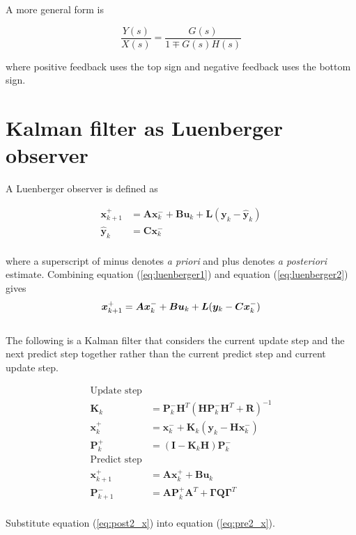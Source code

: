 \documentclass[10pt,conference,compsoc]{IEEEtran}
\newcommand{\mtx}[1] {\bm #1}
\begin{document}
A more general form is

\begin{equation}
  \frac{Y(s)}{X(s)} = \frac{G(s)}{1 \mp G(s) H(s)}
\end{equation}

where positive feedback uses the top sign and negative feedback uses the bottom
sign.

\section{Kalman filter as Luenberger observer} \label{sec:app_kalman_luenberger}

A Luenberger observer is defined as

\begin{align}
  \mtx{x}_{k+1}^+ &= \mtx{A} \mtx{x}_k^- + \mtx{B} \mtx{u}_k + \mtx{L}
    (\mtx{y}_k - \hat{\mtx{y}}_k) \label{eq:luenberger1} \\
  \hat{\mtx{y}}_k &= \mtx{C} \mtx{x}_k^- \label{eq:luenberger2} \\ \nonumber
\end{align}

where a superscript of minus denotes \textit{a priori} and plus denotes
\textit{a posteriori} estimate. Combining equation (\ref{eq:luenberger1}) and
equation (\ref{eq:luenberger2}) gives \\
\begin{equation} \label{eq:luenberger}
  \mtx{x}_{k+1}^+ = \mtx{A} \mtx{x}_k^- + \mtx{B} \mtx{u}_k + \mtx{L}
    (\mtx{y}_k - \mtx{C} \mtx{x}_k^-) \\
\end{equation}
\\
The following is a Kalman filter that considers the current update step and the
next predict step together rather than the current predict step and current
update step.

\begin{align}
  \text{Update step} \nonumber \\
  \mtx{K}_k &= \mtx{P}_k^- \mtx{H}^T (\mtx{H}\mtx{P}_k^- \mtx{H}^T +
    \mtx{R})^{-1} \\
  \mtx{x}_k^+ &= \mtx{x}_k^- + \mtx{K}_k (\mtx{y}_k - \mtx{H} \mtx{x}_k^-)
    \label{eq:post2_x} \\
  \mtx{P}_k^+ &= (\mtx{I} - \mtx{K}_k\mtx{H})\mtx{P}_k^- \\
  \text{Predict step} \nonumber \\
  \mtx{x}_{k+1}^+ &= \mtx{A} \mtx{x}_k^+ + \mtx{B} \mtx{u}_k
    \label{eq:pre2_x} \\
  \mtx{P}_{k+1}^- &= \mtx{A} \mtx{P}_k^+ \mtx{A}^T +
    \mtx{\Gamma}\mtx{Q}\mtx{\Gamma}^T
\end{align}
\\
Substitute equation (\ref{eq:post2_x}) into equation (\ref{eq:pre2_x}).
\end{document}
